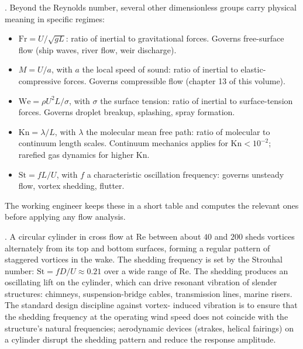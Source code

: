 

. Beyond the
Reynolds number, several other dimensionless groups carry physical
meaning in specific regimes:

\begin{itemize}[leftmargin=*]
  \item {} $\text{Fr} = U/\sqrt{gL}$: ratio of
    inertial to gravitational forces. Governs free-surface flow
    (ship waves, river flow, weir discharge).
  \item {} $M = U/a$, with $a$ the local speed
    of sound: ratio of inertial to elastic-compressive forces.
    Governs compressible flow (chapter 13 of this volume).
  \item {} $\text{We} = \rho U^2 L/\sigma$, with
    $\sigma$ the surface tension: ratio of inertial to
    surface-tension forces. Governs droplet breakup, splashing,
    spray formation.
  \item {} $\text{Kn} = \lambda/L$, with
    $\lambda$ the molecular mean free path: ratio of molecular to
    continuum length scales. Continuum mechanics applies for
    $\text{Kn} < 10^{-2}$; rarefied gas dynamics for higher Kn.
  \item {} $\text{St} = fL/U$, with $f$ a
    characteristic oscillation frequency: governs unsteady flow,
    vortex shedding, flutter.
\end{itemize}

The working engineer keeps these in a short table and computes
the relevant ones before applying any flow analysis.

. A circular cylinder in cross
flow at $\text{Re}$ between about $40$ and $200$ sheds vortices
alternately from its top and bottom surfaces, forming a regular
pattern of staggered vortices in the wake. The shedding frequency
is set by the Strouhal number: $\text{St} = fD/U \approx 0.21$ over
a wide range of $\text{Re}$. The shedding produces an oscillating
lift on the cylinder, which can drive resonant vibration of
slender structures: chimneys, suspension-bridge cables, transmission
lines, marine risers. The standard design discipline against vortex-
induced vibration is to ensure that the shedding frequency at the
operating wind speed does not coincide with the structure's
natural frequencies; aerodynamic devices (strakes, helical
fairings) on a cylinder disrupt the shedding pattern and reduce
the response amplitude.

